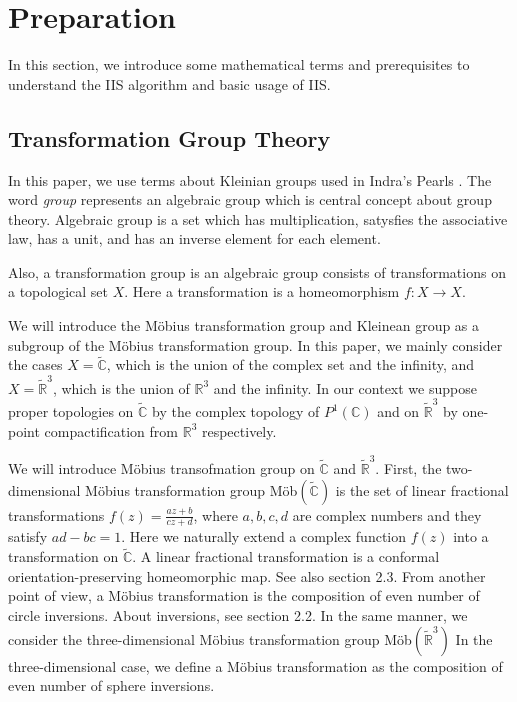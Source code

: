 
\section{Preparation}

In this section, we introduce some mathematical terms and prerequisites
to understand the IIS algorithm and basic usage of IIS.

\subsection{Transformation Group Theory}

In this paper, we use terms about Kleinian groups used in Indra's
Pearls \cite{MumfordSeriesWright200204}.
The word \textit{group} represents an algebraic group which is
central concept about group theory.
Algebraic group is a set which has multiplication, satysfies the
associative law, has a unit, and has an inverse element for each
element.

Also, a transformation group is an algebraic group consists of transformations 
on a topological set $X$.  Here a transformation is a homeomorphism
$f:X \to X$.

We will introduce the M\"obius transformation group and Kleinean group
as a subgroup of the M\"obius transformation group. 
In this paper, we mainly consider the cases $X=\tilde{\mathbb{C}}$,
which is the union of the complex set and the infinity, 
and $X=\tilde{ \mathbb{R} }^3$, which is the union of $\mathbb{R}^3$ and the infinity.
In our context we suppose proper topologies on $\tilde{\mathbb{C}}$ 
by the complex topology of $P^1(\mathbb{C})$ and on $\tilde{ \mathbb{R} }^3$
by one-point compactification from $\mathbb{R}^3$ respectively.

We will introduce M\"obius transofmation group on $\tilde{\mathbb{C}}$ and $\tilde{ \mathbb{R} }^3$.  
First, the two-dimensional M\"obius transformation group
\textrm{M\"ob}$(\tilde{\mathbb{C}})$ is the set of linear fractional transformations $f(z)=\frac{az+b}{cz+d}$, 
where $a,b,c,d$ are complex numbers and they satisfy $ad-bc = 1$. Here we naturally extend a complex function $f(z)$ 
into a transformation on $\tilde{\mathbb{C}}$.  
A linear fractional transformation is a conformal orientation-preserving homeomorphic map.
See also section 2.3.
From another point of view, a M\"obius transformation is the composition of even number of circle inversions.  
About inversions, see section 2.2.
In the same manner, we consider the three-dimensional M\"obius
transformation group \textrm{M\"ob}$(\tilde{\mathbb{R}}^3)$
In the three-dimensional case, we define a M\"obius transformation as
the composition of even number of sphere inversions.

